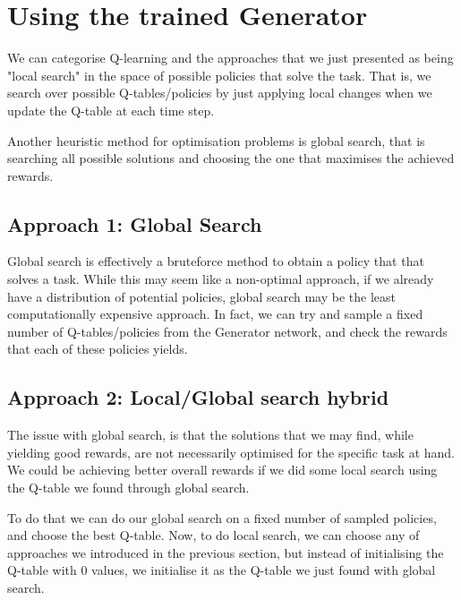 

\section{Using the trained Generator}
We can categorise Q-learning and the approaches that we just presented as being "local search" in the space of possible policies that solve the task. That is, we search over possible Q-tables/policies by just applying local changes when we update the Q-table at each time step.

Another heuristic method for optimisation problems is global search, that is searching all possible solutions and choosing the one that maximises the achieved rewards.

\subsection{Approach 1: Global Search}
Global search is effectively a bruteforce method to obtain a policy that 
that solves a task. While this may seem like a non-optimal approach, if we already have a distribution of potential policies, global search may be the least computationally expensive approach.
In fact, we can try and sample a fixed number of Q-tables/policies from the Generator network, and check the rewards that each of these policies yields.

\subsection{Approach 2: Local/Global search hybrid}
The issue with global search, is that the solutions that we may find, while yielding good rewards, are not necessarily optimised for the specific task at hand. We could be achieving better overall rewards if we did some local search using the Q-table we found through global search.

To do that we can do our global search on a fixed number of sampled policies, and choose the best Q-table. 
Now, to do local search, we can choose any of approaches we introduced in the previous section, but instead of initialising the Q-table with 0 values, we initialise it as the Q-table we just found with global search.

